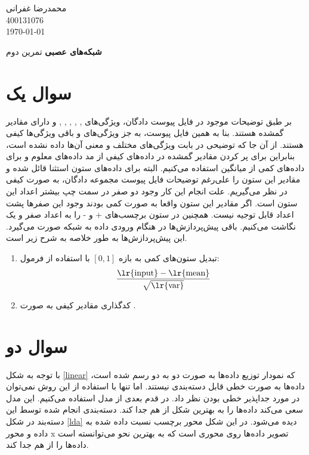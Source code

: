 \documentclass[12pt, a4paper]{article}
\newcommand{\coursetitle}{شبکه‌های عصبی}
\newcommand{\doctitle}{تمرین دوم}
\newcommand{\name}{محمدرضا غفرانی}
\newcommand{\studentno}{400131076}
\newcommand{\todaydate}{\today}
\begin{document}
\begin{flushleft}
    \name \\
    \studentno \\
    \todaydate
\end{flushleft}

\begin{center}
    \huge
    \textbf{\coursetitle}
    \break
    \large
    \doctitle
\end{center}

\thispagestyle{plain}

\section*{سوال یک}

بر طبق توضیحات موجود در فایل پیوست دادگان، ویژگی‌های , , , , ,  و
 دارای مقادیر گمشده هستند. بنا به همین فایل پیوست، به جز ویژگی‌های  و  باقی ویژگی‌ها
کیفی هستند. از آن جا که توضیحی در بابت ویژگی‌های مختلف و معنی آن‌ها داده نشده است، بنابراین برای پر کردن
مقادیر گمشده در داده‌های کیفی از مد داده‌های معلوم و برای داده‌های کمی از میانگین استفاده می‌کنیم. البته برای داده‌های
ستون  استثنا قائل شده و مقادیر این ستون را علی‌رغم توضیحات فایل پیوست مجموعه دادگان، به صورت کیفی
در نظر می‌گیریم. علت انجام این کار وجود دو صفر در سمت چپ بیشتر اعداد این ستون است. اگر مقادیر این ستون
واقعا به صورت کمی بودند وجود این صفر‌ها پشت اعداد قابل توجیه نیست. همچنین در ستون برچسب‌های + و - را به
اعداد صفر و یک نگاشت می‌کنیم. باقی پیش‌پردازش‌ها در هنگام ورودی داده به شبکه صورت می‌گیرد. این پیش‌پردازش‌ها به
طور خلاصه به شرح زیر است.

\begin{enumerate}
    \item تبدیل ستون‌های کمی به بازه $[0,1]$ با استفاده از فرمول:
    $$\frac{\text{\lr{input}} - \text{\lr{mean}}}{\sqrt{\text{\lr{var}}}}$$
    \item کد‌گذاری مقادیر کیفی به صورت .
\end{enumerate}

\clearpage

\section*{سوال دو}

با توجه به شکل \ref{linear} که نمودار توزیع داده‌ها به صورت دو به دو رسم شده است، داده‌ها به صورت خطی قابل دسته‌بندی نیستند.
اما تنها با استفاده از این روش نمی‌توان در مورد جداپذیر خطی بودن نظر داد. در قدم بعدی از مدل
 استفاده می‌کنیم. این مدل سعی می‌کند داده‌ها را به بهترین شکل
از هم جدا کند. دسته‌بندی انجام شده توسط این دسته‌بند در شکل \ref{lda} دیده می‌شود. در این شکل محور
 برچسب نسبت داده شده به داده و محور x تصویر داده‌ها روی محوری است که به بهترین نحو می‌توانسته است
داده‌ها را از هم جدا کند.
\end{document}
